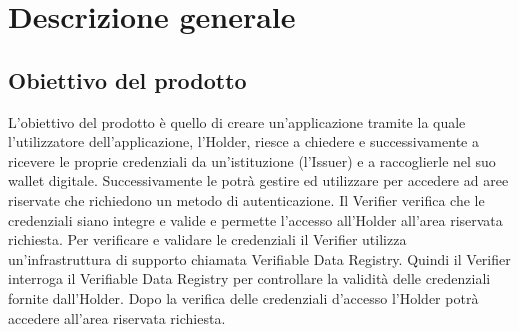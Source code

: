 \section{Descrizione generale}

\subsection{Obiettivo del prodotto}
L’obiettivo del prodotto è quello di creare un’applicazione tramite la quale l’utilizzatore dell’applicazione, l’Holder, riesce a chiedere e successivamente a ricevere le proprie credenziali da un’istituzione (l’Issuer) e a raccoglierle nel suo wallet digitale. Successivamente le potrà gestire ed utilizzare per accedere ad aree riservate che richiedono un metodo di autenticazione. Il Verifier verifica che le credenziali siano integre e valide e permette l’accesso all’Holder all’area riservata richiesta. Per verificare e validare le credenziali il Verifier utilizza un’infrastruttura di supporto chiamata Verifiable Data Registry. Quindi il Verifier interroga il Verifiable Data Registry per controllare la validità delle credenziali fornite dall’Holder. Dopo la verifica delle credenziali d’accesso l’Holder potrà accedere all’area riservata richiesta.

